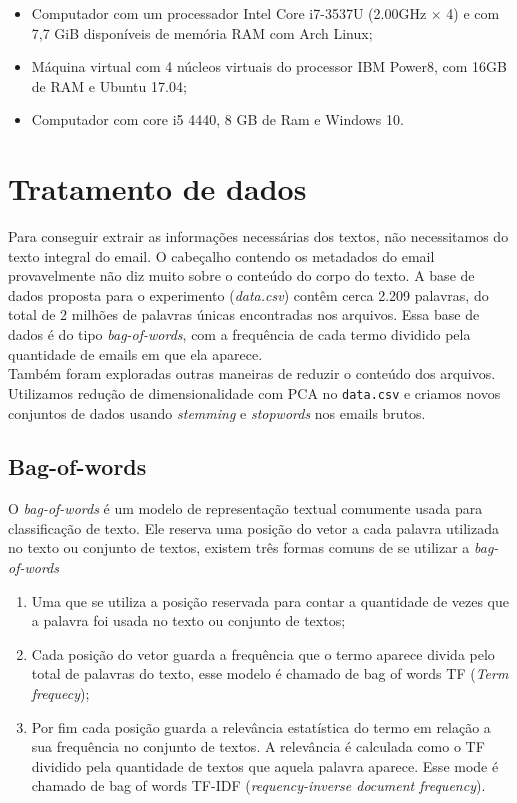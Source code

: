 \documentclass[conference]{IEEEtran}
\begin{document}
\begin{itemize}
\item Computador com um processador Intel Core i7-3537U (2.00GHz × 4) e com 7,7 GiB disponíveis de memória RAM com Arch Linux;

\item Máquina virtual com 4 núcleos virtuais do processor IBM Power8, com 16GB de RAM e  Ubuntu 17.04;

\item Computador com core i5 4440, 8 GB de Ram e Windows 10.

\end{itemize}

\section{Tratamento de dados}

Para conseguir extrair as informações necessárias dos textos, não necessitamos do texto integral do email. O cabeçalho contendo os metadados do email provavelmente não diz muito sobre o conteúdo do corpo do texto. A base de dados proposta para o experimento (\textit{data.csv}) contêm cerca 2.209 palavras, do total de 2 milhões de palavras únicas encontradas nos arquivos. Essa base de dados é do tipo \textit{bag-of-words}, com a frequência de cada termo dividido pela quantidade de emails em que ela aparece.\\
Também foram exploradas outras maneiras de reduzir o conteúdo dos arquivos. Utilizamos redução de dimensionalidade com PCA no \texttt{data.csv} e criamos novos conjuntos de dados usando \textit{stemming} e \textit{stopwords} nos emails brutos.

\subsection{Bag-of-words}
O \textit{bag-of-words} é um modelo de representação textual comumente usada para classificação de texto. Ele reserva uma posição do vetor a cada palavra utilizada no texto ou conjunto de textos, existem três formas comuns de se utilizar a \textit{bag-of-words}\cite{b10}
\begin{enumerate}
\item Uma que se utiliza a posição reservada para contar a quantidade de vezes que a palavra foi usada no texto ou conjunto de textos;
\item Cada posição do vetor guarda a frequência que o termo aparece divida pelo total de palavras do texto, esse modelo é chamado de bag of words TF (\textit{Term frequecy});
\item Por fim cada posição guarda a relevância estatística do termo em relação a sua frequência no conjunto de textos. A relevância é calculada como o TF dividido pela quantidade de textos que aquela palavra aparece. Esse mode é chamado de bag of words TF-IDF (\textit{requency-inverse document frequency}).
\end{enumerate}
\end{document}
